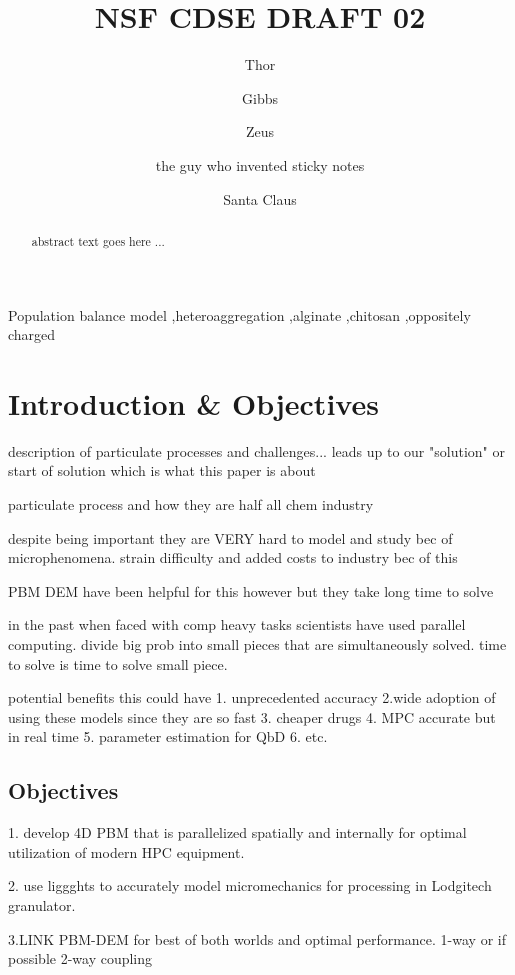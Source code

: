 \documentclass[preprint,11pt,authoryear]{elsarticle}
\begin{document}
\begin{frontmatter}
\title{ NSF CDSE DRAFT 02}
\author{Thor }
\author{Gibbs }
\author{Zeus }
\author{the guy who invented sticky notes }
\author{Santa Claus} 
\address{North Pole department of ice and snow Fwding address - Department of Chemical and Biochemical Engineering, Rutgers, The State University of New Jersey, Piscataway, NJ, USA 08854}
\begin{abstract}
 abstract text goes here ...
\end{abstract}
\begin{keyword}
Population balance model \sep heteroaggregation \sep alginate  \sep chitosan \sep oppositely charged
\end{keyword}
\end{frontmatter}
\linenumbers

\section{Introduction \& Objectives} 
description of particulate processes and challenges... leads up to our "solution" or start of solution which is what this paper is about 
\par particulate process and how they are half all chem industry
\par despite being important they are VERY hard to model and study bec of microphenomena. strain difficulty and added costs to industry bec of this
\par PBM DEM have been helpful for this however but they take long time to solve
\par in the past when faced with comp heavy tasks scientists have used parallel computing. divide big prob into small pieces that are simultaneously solved. time to solve is time to solve small piece. 
\par potential benefits this could have 1. unprecedented accuracy 2.wide adoption of using these models since they are so fast 3. cheaper drugs 4. MPC accurate but in real time 5. parameter estimation for QbD 6. etc. 

    \subsection{Objectives}
    \par 1. develop 4D PBM that is parallelized spatially and internally for optimal utilization of modern HPC equipment.
    \par 2. use liggghts to accurately model micromechanics for processing in Lodgitech granulator. 
    \par 3.LINK PBM-DEM for best of both worlds and optimal performance.  1-way or if possible 2-way coupling
\end{document}
